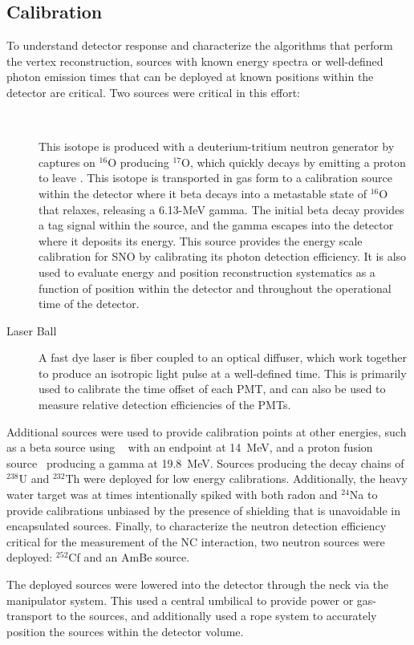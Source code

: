 \subsection{Calibration}

To understand detector response and characterize the algorithms that perform the vertex reconstruction, sources with known energy spectra or well-defined photon emission times that can be deployed at known positions within the detector are critical.
Two sources were critical in this effort:
\begin{description}
\item[\N~\cite{sno_n16}] This isotope is produced with a deuterium-tritium neutron generator by captures on $^{16}$O producing $^{17}$O, which quickly decays by emitting a proton to leave \N. This isotope is transported in gas form to a calibration source within the detector where it beta decays into a metastable state of $^{16}$O that relaxes, releasing a 6.13-MeV gamma. The initial beta decay provides a tag signal within the source, and the gamma escapes into the detector where it deposits its energy. This source provides the energy scale calibration for SNO by calibrating its photon detection efficiency. It is also used to evaluate energy and position reconstruction systematics as a function of position within the detector and throughout the operational time of the detector.
\item[Laser Ball~\cite{sno_laserball}] A fast dye laser is fiber coupled to an optical diffuser, which work together to produce an isotropic light pulse at a well-defined time. This is primarily used to calibrate the time offset of each PMT, and can also be used to measure relative detection efficiencies of the PMTs.
\end{description}
Additional sources were used to provide calibration points at other energies, such as a beta source using \Li~\cite{Tagg:2002} with an endpoint at 14~MeV, and a proton fusion source~\cite{fusion_source} producing a gamma at 19.8~MeV.
Sources producing the decay chains of $^{238}$U and $^{232}$Th were deployed for low energy calibrations.
Additionally, the heavy water target was at times intentionally spiked with both radon and $^{24}$Na to provide calibrations unbiased by the presence of shielding that is unavoidable in encapsulated sources.
Finally, to characterize the neutron detection efficiency critical for the measurement of the NC interaction, two neutron sources were deployed: $^{252}$Cf and an AmBe source.

The deployed sources were lowered into the detector through the neck via the manipulator system.
This used a central umbilical to provide power or gas-transport to the sources, and additionally used a rope system to accurately position the sources within the detector volume.

